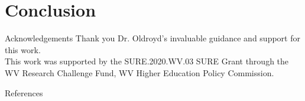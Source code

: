 \documentclass{beamer}
\newtheorem{conjecture}{Conjecture}
\begin{document}
{%

}   




\section{Conclusion}
\begin{frame}{Acknowledgements}
    Thank you Dr. Oldroyd's invaluable guidance and support for this work. \\
    
    This work was supported by the SURE.2020.WV.03 SURE Grant through the WV Research Challenge Fund, WV Higher Education Policy Commission.
\end{frame}


{
\usebackgroundtemplate{}
\begin{frame}[allowframebreaks]{References}
    \printbibliography
    
\end{frame}
}
 
\end{document}
